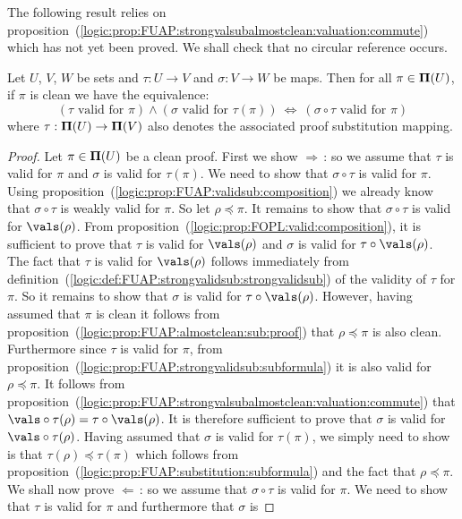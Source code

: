 The following result relies on
proposition~(\ref{logic:prop:FUAP:strongvalsubalmostclean:valuation:commute})
which has not yet been proved. We shall check  that no circular
reference occurs.

\begin{prop}\label{logic:prop:FUAP:strongvalidsub:composition}
Let $U$, $V$, $W$ be sets and $\tau:U\to V$ and $\sigma:V\to W$ be
maps. Then for all $\pi\in{\bf\Pi}(U)$, if $\pi$ is clean we have
the equivalence:
\[
    (\mbox{$\tau$ valid for $\pi$})\land(\mbox{$\sigma$ valid for
    $\tau(\pi)$})\ \Leftrightarrow\ (\mbox{$\sigma\circ\tau$ valid for
    $\pi$})
\]
where $\tau:{\bf\Pi}(U)\to{\bf\Pi}(V)$ also denotes the associated
proof substitution mapping.
\end{prop}
\begin{proof}
Let $\pi\in{\bf\Pi}(U)$ be a clean proof. First we show
$\Rightarrow$\,: so we assume that $\tau$ is valid for $\pi$ and
$\sigma$ is valid for $\tau(\pi)$. We need to show that
$\sigma\circ\tau$ is valid for $\pi$. Using
proposition~(\ref{logic:prop:FUAP:validsub:composition}) we already
know that $\sigma\circ\tau$ is weakly valid for $\pi$. So let
$\rho\preceq\pi$. It remains to show that $\sigma\circ\tau$ is valid
for $\vals(\rho)$. From
proposition~(\ref{logic:prop:FOPL:valid:composition}), it is
sufficient to prove that $\tau$ is valid for $\vals(\rho)$ and
$\sigma$ is valid for $\tau\circ\vals(\rho)$. The fact that $\tau$
is valid for $\vals(\rho)$ follows immediately from
definition~(\ref{logic:def:FUAP:strongvalidsub:strongvalidsub}) of
the validity of $\tau$ for $\pi$. So it remains to show that
$\sigma$ is valid for $\tau\circ\vals(\rho)$. However, having
assumed that $\pi$ is clean it follows from
proposition~(\ref{logic:prop:FUAP:almostclean:sub:proof}) that
$\rho\preceq\pi$ is also clean. Furthermore since $\tau$ is valid
for $\pi$, from
proposition~(\ref{logic:prop:FUAP:strongvalidsub:subformula}) it is
also valid for $\rho\preceq\pi$. It follows from
proposition~(\ref{logic:prop:FUAP:strongvalsubalmostclean:valuation:commute})
that $\vals\circ\tau(\rho)=\tau\circ\vals(\rho)$. It is therefore
sufficient to prove that $\sigma$ is valid for
$\vals\circ\tau(\rho)$. Having assumed that $\sigma$ is valid for
$\tau(\pi)$, we simply need to show is that
$\tau(\rho)\preceq\tau(\pi)$ which follows from
proposition~(\ref{logic:prop:FUAP:substitution:subformula}) and the
fact that $\rho\preceq\pi$. We shall now prove $\Leftarrow$\,: so we
assume that $\sigma\circ\tau$ is valid for $\pi$. We need to show
that $\tau$ is valid for $\pi$ and furthermore that $\sigma$ is

\end{proof}
